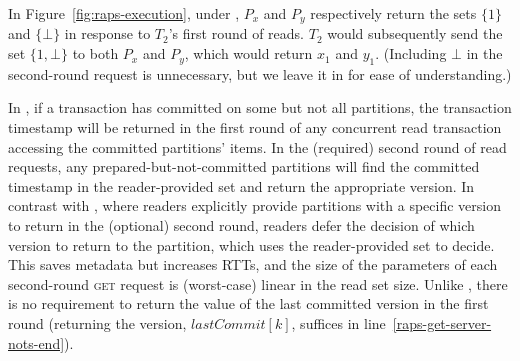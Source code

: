  In Figure~\ref{fig:raps-execution}, under \raps,
$P_x$ and $P_y$ respectively return the sets $\{1\}$ and
$\{\bot\}$ in response to $T_2$'s first round of reads. $T_2$ would
subsequently send the set $\{1, \bot\}$ to both $P_x$ and $P_y$, which
would return $x_1$ and $y_1$.  (Including $\bot$ in the second-round
request is unnecessary, but we leave it in for ease of understanding.)

 In \raps, if a transaction has committed on
some but not all partitions, the transaction timestamp will be
returned in the first round of any concurrent read transaction
accessing the committed partitions' items. In the (required) second
round of read requests, any prepared-but-not-committed partitions will
find the committed timestamp in the reader-provided set and return the
appropriate version. In contrast with \rapl, where readers explicitly
provide partitions with a specific version to return in the (optional)
second round, \raps readers defer the decision of which version to
return to the partition, which uses the reader-provided set to
decide. This saves metadata but increases RTTs, and the size of the
parameters of each second-round \textsc{get} request is (worst-case)
linear in the read set size. Unlike \rapl, there is no requirement to
return the value of the last committed version in the first round
(returning the version, $lastCommit[k]$, suffices in
line~\ref{raps-get-server-nots-end}).

